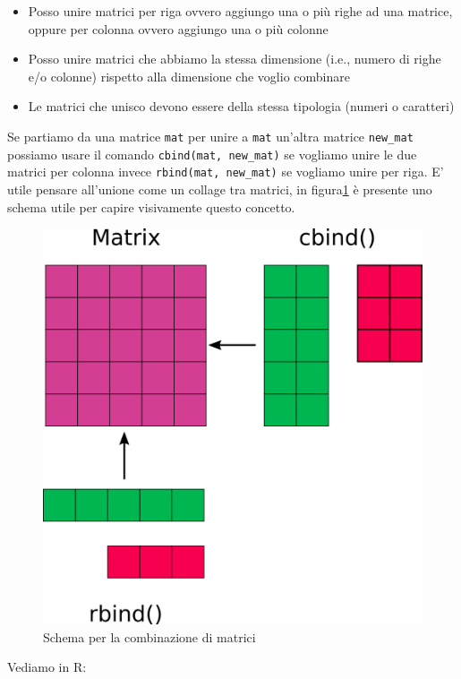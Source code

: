 \documentclass[
]{book}
\providecommand{\tightlist}{%
  \setlength{\itemsep}{0pt}\setlength{\parskip}{0pt}}
\begin{document}
\begin{itemize}
\tightlist
\item
  Posso unire matrici per riga ovvero aggiungo una o più righe ad una matrice, oppure per colonna ovvero aggiungo una o più colonne
\item
  Posso unire matrici che abbiamo la stessa dimensione (i.e., numero di righe e/o colonne) rispetto alla dimensione che voglio combinare
\item
  Le matrici che unisco devono essere della stessa tipologia (numeri o caratteri)
\end{itemize}

Se partiamo da una matrice \texttt{mat} per unire a \texttt{mat} un'altra matrice \texttt{new\_mat} possiamo usare il comando \texttt{cbind(mat,\ new\_mat)} se vogliamo unire le due matrici per colonna invece \texttt{rbind(mat,\ new\_mat)} se vogliamo unire per riga. E' utile pensare all'unione come un collage tra matrici, in figura\ref{fig:mat-comb} è presente uno schema utile per capire visivamente questo concetto.

\begin{figure}

{\centering \includegraphics[width=0.5\linewidth]{images/matrix_comb} 

}

\caption{Schema per la combinazione di matrici}\label{fig:mat-comb}
\end{figure}

Vediamo in R:
\end{document}
